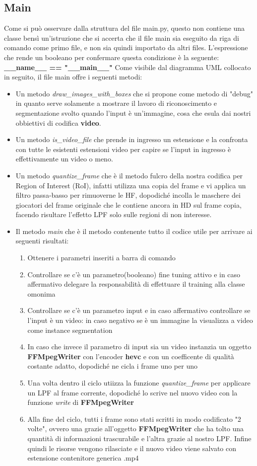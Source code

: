 \subsection*{Main}
Come si può osservare dalla struttura del file main.py, questo non contiene una classe bensì un'istruzione che si accerta che il file main sia eseguito da riga di comando come primo file, e non sia quindi importato da altri files.
L'espressione che rende un booleano per confermare questa condizione è la seguente: \textbf{\_\_name\_\_ == "\_\_main\_\_"}
Come visibile dal diagramma UML collocato in seguito, il file main offre i seguenti metodi:
\begin{itemize}
\item Un metodo \emph{draw\_images\_with\_boxes} che si propone come metodo di "debug" in quanto serve solamente a mostrare il lavoro di riconoscimento e segmentazione svolto quando l'input è un'immagine, cosa che esula dai nostri obbiettivi di codifica \textbf{video}.
\item Un metodo \emph{is\_video\_file} che prende in ingresso un estensione e la confronta con tutte le esistenti estensioni video per capire se l'input in ingresso è effettivamente un video o meno.
\item Un metodo \emph{quantize\_frame} che è il metodo fulcro della nostra codifica per Region of Interest (RoI), infatti utilizza una copia del frame e vi applica un filtro passa-basso per rimuoverne le HF, dopodiché incolla le maschere dei giocatori del frame originale che le contiene ancora in HD sul frame copia, facendo risultare l'effetto LPF solo sulle regioni di non interesse.
\item Il metodo  \emph{main} che è il metodo contenente tutto il codice utile per arrivare ai seguenti risultati:
\begin{enumerate}
\item Ottenere i parametri inseriti a barra di comando
\item Controllare se c'è un parametro(booleano) fine tuning attivo e in caso affermativo delegare la responsabilità di effettuare il training alla classe omonima
\item Controllare se c'è un parametro input e in caso affermativo controllare se l'input è un video: in caso negativo se è un immagine la visualizza a video come instance segmentation
\item In caso che invece il parametro di input sia un video instanzia un oggetto \textbf{FFMpegWriter} con l'encoder \textbf{hevc} e con un coefficente di qualità costante adatto, dopodiché ne cicla i frame uno per uno
\item Una volta dentro il ciclo utiizza la funzione \emph{quantize\_frame} per applicare un LPF al frame corrente, dopodiché lo scrive nel nuovo video con la funzione \emph{write} di \textbf{FFMpegWriter}
\item Alla fine del ciclo, tutti i frame sono stati scritti in modo codificato "2 volte", ovvero una grazie all'oggetto \textbf{FFMpegWriter} che ha tolto una quantità di informazioni trascurabile e l'altra grazie al nostro LPF. Infine quindi le risorse vengono rilasciate e il nuovo video viene salvato con estensione contenitore generica .mp4
\end{enumerate}
\end{itemize}
